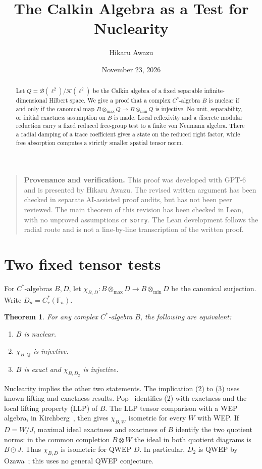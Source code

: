 \documentclass[11pt,a4paper]{article}
\title{The Calkin Algebra as a Test for Nuclearity}
\author{Hikaru Awazu}
\date{November 23, 2026}
\newcommand{\minn}{\otimes_{\min}}
\newcommand{\maxx}{\otimes_{\max}}
\newcommand{\F}{\mathbb F}
\newtheorem{theorem}{Theorem}
\begin{document}
\maketitle
\begin{abstract}
Let \(Q=\mathcal B(\ell^2)/\mathcal K(\ell^2)\) be the Calkin algebra of a fixed separable infinite-dimensional Hilbert space. We give a proof that a complex \(C^*\)-algebra \(B\) is nuclear if and only if the canonical map \(B\maxx Q\to B\minn Q\) is injective. No unit, separability, or initial exactness assumption on \(B\) is made. Local reflexivity and a discrete modular reduction carry a fixed reduced free-group test to a finite von Neumann algebra. There a radial damping of a trace coefficient gives a state on the reduced right factor, while free absorption computes a strictly smaller spatial tensor norm.
\end{abstract}
\begin{quote}\small
\textbf{Provenance and verification.} This proof was developed with GPT-6 and is presented by Hikaru Awazu. The revised written argument has been checked in separate AI-assisted proof audits, but has not been peer reviewed. The main theorem of this revision has been checked in Lean, with no unproved assumptions or \texttt{sorry}. The Lean development follows the radial route and is not a line-by-line transcription of the written proof.
\end{quote}
\section{Two fixed tensor tests}
For \(C^*\)-algebras \(B,D\), let \(\chi_{B,D}:B\maxx D\to B\minn D\) be the canonical surjection. Write \(D_n=C_r^*(\F_n)\).
\begin{theorem}\label{thm:main}
For any complex \(C^*\)-algebra \(B\), the following are equivalent:
\begin{enumerate}
\item \(B\) is nuclear.
\item \(\chi_{B,Q}\) is injective.
\item \(B\) is exact and \(\chi_{B,D_2}\) is injective.
\end{enumerate}
\end{theorem}

Nuclearity implies the other two statements. The implication (2) to (3) uses known lifting and exactness results. Pop~\cite[Proposition 4.1]{pop} identifies (2) with exactness and the local lifting property (LLP) of \(B\). The LLP tensor comparison with a WEP algebra, in Kirchberg~\cite[Proposition 1.1]{kirchberg}, then gives \(\chi_{B,W}\) isometric for every \(W\) with WEP. If \(D=W/J\), maximal ideal exactness and exactness of \(B\) identify the two quotient norms: in the common completion \(B\otimes W\) the ideal in both quotient diagrams is \(\overline{B\odot J}\). Thus \(\chi_{B,D}\) is isometric for QWEP \(D\). In particular, \(D_2\) is QWEP by Ozawa~\cite[\S4, final paragraph]{ozawa}; this uses no general QWEP conjecture.
\end{document}
